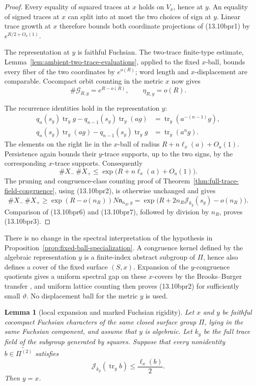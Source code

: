 \documentclass[11pt,reqno]{amsart}
\newtheorem{lemma}[theorem]{Lemma}
\theoremstyle{definition}
\theoremstyle{remark}
\newcommand{\Tr}{\operatorname{tr}}
\begin{document}
\begin{proof}
Every equality of squared traces at \(x\) holds on \(V_x\), hence at
\(y\).  An equality of signed traces at \(x\) can split into at most the
two choices of sign at \(y\).  Linear trace growth at \(x\) therefore
bounds both coordinate projections of (13.10bpr1) by
\(e^{R/2+O_a(1)}\).

The representation at \(y\) is faithful Fuchsian.  The two-trace
finite-type estimate, Lemma~\ref{lem:ambient-two-trace-evaluations},
applied to the fixed \(x\)-ball, bounds every fiber of the two coordinates
by \(e^{o(R)}\); word length and \(x\)-displacement are comparable.
Cocompact orbit counting in the metric \(x\) now gives
\[
 \#\mathcal G_{R,y}=e^{R-o(R)},\qquad \eta_{R,y}=o(R).
\tag{13.10bpr4}
\]

The recurrence identities hold in the representation \(y\):
\[
 \begin{aligned}
 q_n(s_y)\Tr_y g-q_{n-1}(s_y)\Tr_y(ag)
   &=\Tr_y(a^{-(n-1)}g),\\
 q_n(s_y)\Tr_y(ag)-q_{n-1}(s_y)\Tr_y g
   &=\Tr_y(a^ng).
 \end{aligned}
\tag{13.10bpr5}
\]
The elements on the right lie in the \(x\)-ball of radius
\(R+n\ell_x(a)+O_a(1)\).  Persistence again bounds their \(y\)-trace
supports, up to the two signs, by the corresponding \(x\)-trace supports.
Consequently
\[
 \#X_-\,\#X_+
 \le\exp\bigl(R+n\ell_x(a)+O_a(1)\bigr).
\tag{13.10bpr6}
\]
The pruning and congruence-class counting proof of
Theorem~\ref{thm:full-trace-field-congruence}, using (13.10bpr2), is
otherwise unchanged and gives
\[
 \#X_-\,\#X_+
 \ge
 \exp(R-o(n_R))N\mathfrak n_{n_R,y}
 =
 \exp\bigl(R+2n_R\mathcal J_{k_y}(s_y)-o(n_R)\bigr).
\tag{13.10bpr7}
\]
Comparison of (13.10bpr6) and (13.10bpr7), followed by division by
\(n_R\), proves (13.10bpr3).
\end{proof}

There is no change in the spectral interpretation of the hypothesis in
Proposition~\ref{prop:fixed-ball-specialization}.  A congruence kernel
defined by the algebraic representation \(y\) is a finite-index abstract
subgroup of \(\Pi\), hence also defines a cover of the fixed surface
\((S,x)\).  Expansion of the \(y\)-congruence quotients gives a uniform
spectral gap on these \(x\)-covers by the Brooks--Burger transfer
\cite{BrooksTower,Burger}, and
uniform lattice counting then proves (13.10bpr2) for sufficiently small
\(\vartheta\).  No displacement ball for the metric \(y\) is used.

\pagebreak[3]
\begin{lemma}[local expansion and marked Fuchsian rigidity]
\label{lem:local-expansion-fuchsian-rigidity}
Let \(x\) and \(y\) be faithful cocompact Fuchsian characters of the same
closed surface group \(\Pi\), lying in the same Fuchsian component, and
assume that \(y\) is algebraic.  Let \(k_y\) be the full trace field of the
subgroup generated by squares.  Suppose that every nonidentity
\(b\in\widetilde{\Pi^{(2)}}\) satisfies
\[
 \mathcal J_{k_y}(\Tr_y b)\le \frac{\ell_x(b)}2.
\tag{13.10bpr9}
\]
Then \(y=x\).
\end{lemma}
\end{document}
